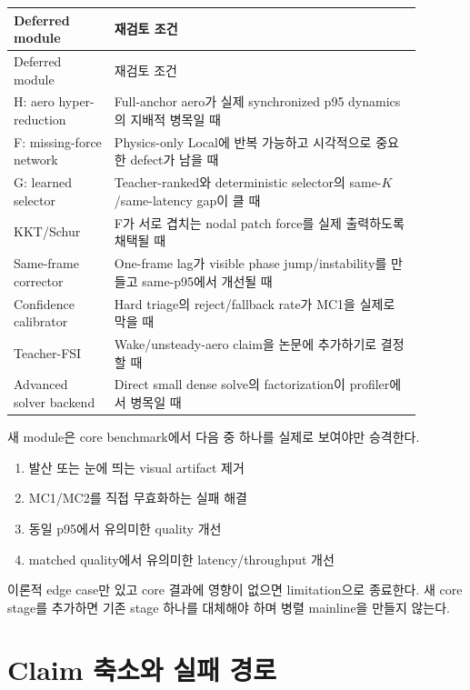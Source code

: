 \documentclass[11pt]{article}
\begin{document}
\begin{longtable}{L{0.22\linewidth}L{0.67\linewidth}}
\toprule
Deferred module & 재검토 조건\\
\midrule
\endfirsthead
\toprule
Deferred module & 재검토 조건\\
\midrule
\endhead
H: aero hyper-reduction & Full-anchor aero가 실제 synchronized p95 dynamics의 지배적 병목일 때\\
F: missing-force network & Physics-only Local에 반복 가능하고 시각적으로 중요한 defect가 남을 때\\
G: learned selector & Teacher-ranked와 deterministic selector의 same-\(K\)/same-latency gap이 클 때\\
KKT/Schur & F가 서로 겹치는 nodal patch force를 실제 출력하도록 채택될 때\\
Same-frame corrector & One-frame lag가 visible phase jump/instability를 만들고 same-p95에서 개선될 때\\
Confidence calibrator & Hard triage의 reject/fallback rate가 MC1을 실제로 막을 때\\
Teacher-FSI & Wake/unsteady-aero claim을 논문에 추가하기로 결정할 때\\
Advanced solver backend & Direct small dense solve의 factorization이 profiler에서 병목일 때\\
\bottomrule
\end{longtable}

새 module은 core benchmark에서 다음 중 하나를 실제로 보여야만 승격한다.

\begin{enumerate}
  \item 발산 또는 눈에 띄는 visual artifact 제거
  \item MC1/MC2를 직접 무효화하는 실패 해결
  \item 동일 p95에서 유의미한 quality 개선
  \item matched quality에서 유의미한 latency/throughput 개선
\end{enumerate}

이론적 edge case만 있고 core 결과에 영향이 없으면 limitation으로 종료한다.
새 core stage를 추가하면 기존 stage 하나를 대체해야 하며 병렬 mainline을 만들지 않는다.

\section{Claim 축소와 실패 경로}
\end{document}

